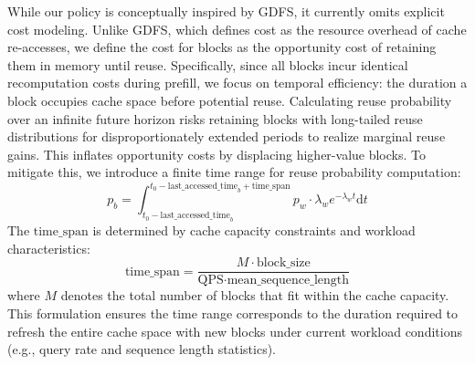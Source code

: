 While our policy is conceptually inspired by GDFS, it currently omits explicit cost modeling.
Unlike GDFS, which defines cost as the resource overhead of cache re-accesses, we define
the cost for {\kvcache} blocks as the opportunity cost of retaining them in memory until reuse.
Specifically, since all {\kvcache} blocks incur identical recomputation costs during prefill,
we focus on temporal efficiency: the duration a block occupies cache space before potential reuse.
Calculating reuse probability over an infinite future horizon risks retaining blocks with
long-tailed reuse distributions for disproportionately extended periods to realize marginal
reuse gains. This inflates opportunity costs by displacing higher-value blocks.
To mitigate this, we introduce a finite time range for reuse probability computation:
$$
p_b = \int_{t_0 - \text{last\_accessed\_time}_b}^{t_0 - \text{last\_accessed\_time}_b + \text{time\_span}} p_w \cdot \lambda_w e^{-\lambda_w t} \mathrm{d}t
$$
The $\text{time\_span}$ is determined by cache capacity constraints and workload characteristics:
$$
\text{time\_span} = \frac{M \cdot \text{block\_size}}{\text{QPS} \cdot \text{mean\_sequence\_length}}
$$
where $M$ denotes the total number of {\kvcache} blocks that fit within the cache capacity.
This formulation ensures the time range corresponds to the duration required to refresh
the entire cache space with new blocks under current workload
conditions (e.g., query rate and sequence length statistics).
\fi

